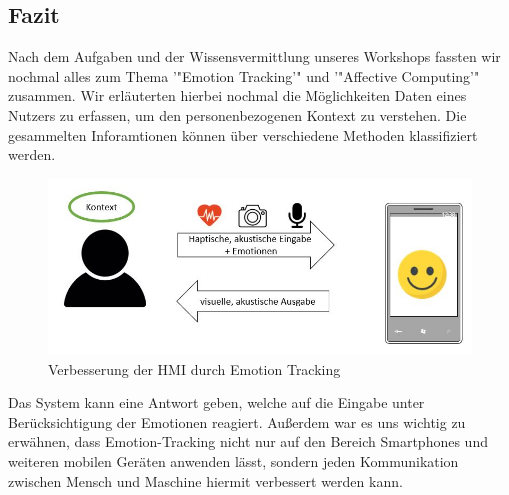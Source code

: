 \subsection{Fazit}

Nach dem Aufgaben und der Wissensvermittlung unseres Workshops fassten wir nochmal alles zum Thema '"Emotion Tracking'" und '"Affective Computing'" zusammen. Wir erläuterten hierbei nochmal die Möglichkeiten Daten eines Nutzers zu erfassen, um den personenbezogenen Kontext zu verstehen. Die gesammelten Inforamtionen können über verschiedene Methoden klassifiziert werden.

\begin{figure}[!h]
	\centering
	\includegraphics[width=0.9\linewidth]{Pictures/Fazit_Grafik}
	\caption[Verbesserung der MMI durch Emotion Tracking]{Verbesserung der \ac{HMI} durch Emotion Tracking}
	\label{fig:fazitgrafik}
\end{figure}

Das System kann eine Antwort geben, welche auf die Eingabe unter Berücksichtigung der Emotionen reagiert. Außerdem war es uns wichtig zu erwähnen, dass Emotion-Tracking nicht nur auf den Bereich Smartphones und weiteren mobilen Geräten anwenden lässt, sondern jeden Kommunikation zwischen Mensch und Maschine hiermit verbessert werden kann. 
